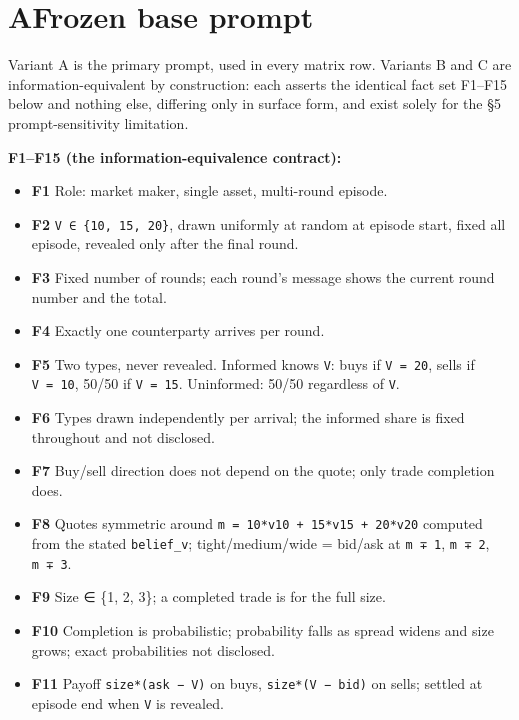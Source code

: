 \documentclass[
  10pt,
]{article}
\providecommand{\tightlist}{%
  \setlength{\itemsep}{0pt}\setlength{\parskip}{0pt}}
\begin{document}
\clearpage
\appendix

\section{A\quad Frozen base prompt}\label{a-frozen-base-prompt}

Variant A is the primary prompt, used in every matrix row. Variants B and C are information-equivalent by construction: each asserts the identical fact set F1--F15 below and nothing else, differing only in surface form, and exist solely for the §5 prompt-sensitivity limitation.

\textbf{F1--F15 (the information-equivalence contract):}

\begin{itemize}
\tightlist
\item
  \textbf{F1} Role: market maker, single asset, multi-round episode.
\item
  \textbf{F2} \texttt{V\ ∈\ \{10,\ 15,\ 20\}}, drawn uniformly at random at episode start, fixed all episode, revealed only after the final round.
\item
  \textbf{F3} Fixed number of rounds; each round's message shows the current round number and the total.
\item
  \textbf{F4} Exactly one counterparty arrives per round.
\item
  \textbf{F5} Two types, never revealed. Informed knows \texttt{V}: buys if \texttt{V\ =\ 20}, sells if \texttt{V\ =\ 10}, 50/50 if \texttt{V\ =\ 15}. Uninformed: 50/50 regardless of \texttt{V}.
\item
  \textbf{F6} Types drawn independently per arrival; the informed share is fixed throughout and not disclosed.
\item
  \textbf{F7} Buy/sell direction does not depend on the quote; only trade completion does.
\item
  \textbf{F8} Quotes symmetric around \texttt{m\ =\ 10*v10\ +\ 15*v15\ +\ 20*v20} computed from the stated \texttt{belief\_v}; tight/medium/wide = bid/ask at \texttt{m\ ∓\ 1}, \texttt{m\ ∓\ 2}, \texttt{m\ ∓\ 3}.
\item
  \textbf{F9} Size ∈ \{1, 2, 3\}; a completed trade is for the full size.
\item
  \textbf{F10} Completion is probabilistic; probability falls as spread widens and size grows; exact probabilities not disclosed.
\item
  \textbf{F11} Payoff \texttt{size*(ask\ −\ V)} on buys, \texttt{size*(V\ −\ bid)} on sells; settled at episode end when \texttt{V} is revealed.

\end{itemize}
\end{document}
